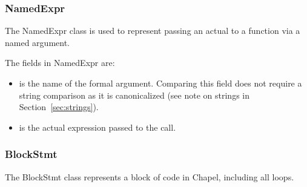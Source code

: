 \documentclass[10pt]{article}
\begin{document}
\subsubsection{NamedExpr}
\label{sec:namedexpr}

The NamedExpr class is used to represent passing an actual to a
function via a named argument.

The fields in NamedExpr are:
\begin{itemize}
\item {} is the name of the formal argument.
  Comparing this field does not require a string comparison as it is
  canonicalized (see note on strings in Section~\ref{sec:strings}).
\item {} is the actual expression passed to the call.
\end{itemize}

\subsubsection{BlockStmt}
\label{sec:blockstmt}

The BlockStmt class represents a block of code in Chapel, including
all loops.
\end{document}
